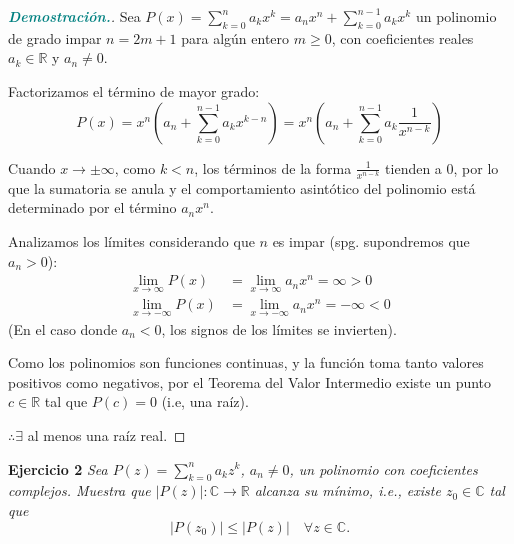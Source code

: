 \documentclass[12pt, letterpaper]{article}
\begin{document}
\begin{proof}[\textbf{\textcolor{teal}{Demostración.}}]
    Sea $P(x) = \sum_{k=0}^{n} a_k x^k = a_n x^n + \sum_{k=0}^{n-1} a_k x^k$ un polinomio de grado impar $n = 2m+1$ para algún entero $m \geq 0$, con coeficientes reales $a_k \in \mathbb{R}$ y $a_n \neq 0$.
    
    Factorizamos el término de mayor grado:
    \[ P(x) = x^n \left( a_n + \sum_{k=0}^{n-1} a_k x^{k-n} \right) = x^n \left( a_n + \sum_{k=0}^{n-1} a_k \frac{1}{x^{n-k}} \right) \]
    
    Cuando $x \to \pm\infty$, como $k < n$, los términos de la forma $\frac{1}{x^{n-k}}$ tienden a $0$, por lo que la sumatoria se anula y el comportamiento asintótico del polinomio está determinado por el término $a_n x^n$.
    
    Analizamos los límites considerando que $n$ es impar (spg. supondremos que $a_n > 0$):
    \begin{align*}
        \lim_{x \to \infty} P(x) &= \lim_{x \to \infty} a_n x^n = \infty > 0 \\
        \lim_{x \to -\infty} P(x) &= \lim_{x \to -\infty} a_n x^n = -\infty < 0
    \end{align*}
    (En el caso donde $a_n < 0$, los signos de los límites se invierten).
    
    Como los polinomios son funciones continuas, y la función toma tanto valores positivos como negativos, por el Teorema del Valor Intermedio existe un punto $c \in \mathbb{R}$ tal que $P(c) = 0$ (i.e, una raíz).
    
    $\therefore \exists$ al menos una raíz real.
\end{proof}

\vspace{0.4cm}
\noindent \textbf{Ejercicio 2} \textit{Sea $P(z) = \sum_{k=0}^{n} a_k z^k$, $a_n \neq 0$, un polinomio con coeficientes complejos. Muestra que $|P(z)| : \mathbb{C} \to \mathbb{R}$ alcanza su mínimo, i.e., existe $z_0 \in \mathbb{C}$ tal que}
\[ |P(z_0)| \leq |P(z)| \quad \forall z \in \mathbb{C}. \]
\end{document}
